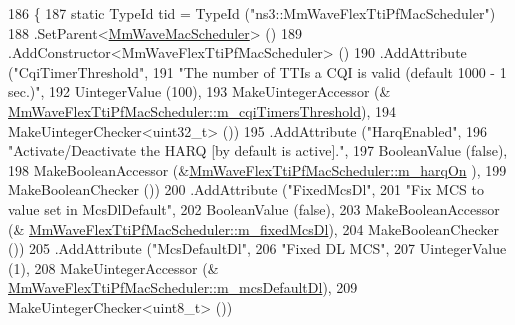 \begin{DoxyCode}
186 \{
187         \textcolor{keyword}{static} TypeId tid = TypeId (\textcolor{stringliteral}{"ns3::MmWaveFlexTtiPfMacScheduler"})
188             .SetParent<\hyperlink{classns3_1_1MmWaveMacScheduler_aad32d6753e98fe1699402d1a722835c4}{MmWaveMacScheduler}> ()
189                 .AddConstructor<MmWaveFlexTtiPfMacScheduler> ()
190     .AddAttribute (\textcolor{stringliteral}{"CqiTimerThreshold"},
191                    \textcolor{stringliteral}{"The number of TTIs a CQI is valid (default 1000 - 1 sec.)"},
192                    UintegerValue (100),
193                    MakeUintegerAccessor (&
      \hyperlink{classns3_1_1MmWaveFlexTtiPfMacScheduler_ad61563379565ec249cdf6b4092fef22e}{MmWaveFlexTtiPfMacScheduler::m\_cqiTimersThreshold}),
194                    MakeUintegerChecker<uint32\_t> ())
195     .AddAttribute (\textcolor{stringliteral}{"HarqEnabled"},
196                    \textcolor{stringliteral}{"Activate/Deactivate the HARQ [by default is active]."},
197                    BooleanValue (\textcolor{keyword}{false}),
198                    MakeBooleanAccessor (&\hyperlink{classns3_1_1MmWaveFlexTtiPfMacScheduler_ab7edfa7baaf0e2ce6c2ba43efc59e291}{MmWaveFlexTtiPfMacScheduler::m\_harqOn}
      ),
199                    MakeBooleanChecker ())
200          .AddAttribute (\textcolor{stringliteral}{"FixedMcsDl"},
201                                                                         \textcolor{stringliteral}{"Fix MCS to value set in
       McsDlDefault"},
202                                                                         BooleanValue (\textcolor{keyword}{false}),
203                                                                         MakeBooleanAccessor (&
      \hyperlink{classns3_1_1MmWaveFlexTtiPfMacScheduler_a6db2b298ff4e4dd82c45b543e9110aa4}{MmWaveFlexTtiPfMacScheduler::m\_fixedMcsDl}),
204                                                                         MakeBooleanChecker ())
205         .AddAttribute (\textcolor{stringliteral}{"McsDefaultDl"},
206                                                                  \textcolor{stringliteral}{"Fixed DL MCS"},
207                                                                  UintegerValue (1),
208                                                                  MakeUintegerAccessor (&
      \hyperlink{classns3_1_1MmWaveFlexTtiPfMacScheduler_aea4907ad0e1c718ba3255d0e1aee369c}{MmWaveFlexTtiPfMacScheduler::m\_mcsDefaultDl}),
209                                                                  MakeUintegerChecker<uint8\_t> ())

\end{DoxyCode}
